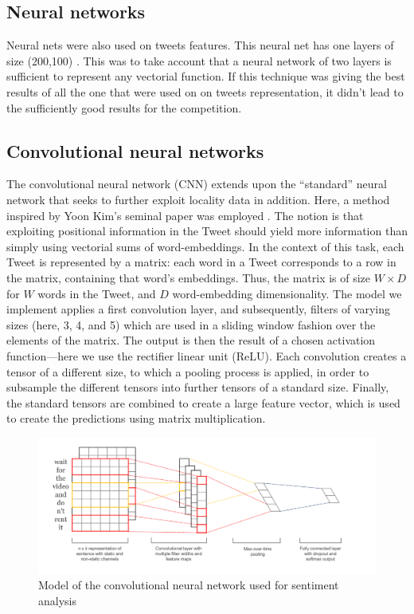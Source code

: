\subsection{Neural networks}

Neural nets were also used on tweets features. This neural net has one layers of size (200,100) . This was to take account that a neural network of  two layers is sufficient to represent any vectorial function.  If this technique was giving the best results of all the one that were used on on tweets representation, it didn't lead to the sufficiently good results for the competition. 

\subsection{Convolutional neural networks}
The convolutional neural network (CNN) extends upon the ``standard'' neural network that seeks to further exploit locality data in addition. Here, a method inspired by Yoon Kim's seminal paper was employed \cite{cnnYoon}. The notion is that exploiting positional information in the Tweet should yield more information than simply using vectorial sums of word-embeddings.
In the context of this task, each Tweet is represented by a matrix: each word in a Tweet corresponds to a row in the matrix, containing that word's embeddings. Thus, the matrix is of size $W \times D$ for $W$ words in the Tweet, and $D$ word-embedding dimensionality.
The model we implement applies a first convolution layer, and subsequently, filters of varying sizes (here, 3, 4, and 5) which are used in a sliding window fashion over the elements of the matrix. The output is then the result of a chosen activation function---here we use the rectifier linear unit (ReLU). Each convolution creates a tensor of a different size, to which a pooling process is applied, in order to subsample the different tensors into further tensors of a standard size. Finally, the standard tensors are combined to create a large feature vector, which is used to create the predictions using matrix multiplication.

\begin{figure}[h!]
\centering
	\includegraphics[scale=0.3]{CNN} 
\caption{Model of the convolutional neural network used for sentiment analysis \cite{cnnYoon}}
\label{plot:CNN}
\end{figure}
\FloatBarrier


